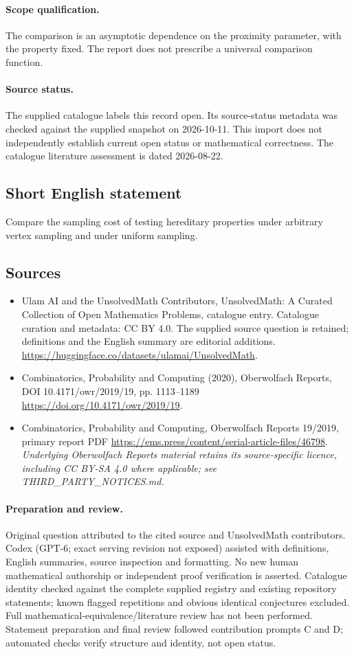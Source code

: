 \documentclass[11pt]{article}
\begin{document}
\paragraph{Scope qualification.}
The comparison is an asymptotic dependence on the proximity parameter, with the property fixed. The report does not prescribe a universal comparison function.
\paragraph{Source status.}
The supplied catalogue labels this record open. Its source-status metadata was checked against the supplied snapshot on 2026-10-11. This import does not independently establish current open status or mathematical correctness. The catalogue literature assessment is dated 2026-08-22.
\subsection{Short English statement}
Compare the sampling cost of testing hereditary properties under arbitrary vertex sampling and under uniform sampling.
\subsection{Sources}
\begin{itemize}
\item[S1] Ulam AI and the UnsolvedMath Contributors, UnsolvedMath: A Curated Collection of Open Mathematics Problems, catalogue entry. Catalogue curation and metadata: CC BY 4.0. The supplied source question is retained; definitions and the English summary are editorial additions.
\url{https://huggingface.co/datasets/ulamai/UnsolvedMath}.
\item[S2] Combinatorics, Probability and Computing (2020), Oberwolfach Reports, DOI 10.4171/owr/2019/19, pp. 1113--1189
\url{https://doi.org/10.4171/owr/2019/19}.
\item[S3] Combinatorics, Probability and Computing, Oberwolfach Reports 19/2019, primary report PDF
\url{https://ems.press/content/serial-article-files/46798}.
\textit{Underlying Oberwolfach Reports material retains its source-specific licence, including CC BY-SA 4.0 where applicable; see THIRD\_PARTY\_NOTICES.md.}
\end{itemize}
\paragraph{Preparation and review.}
Original question attributed to the cited source and UnsolvedMath contributors. Codex (GPT-6; exact serving revision not exposed) assisted with definitions, English summaries, source inspection and formatting. No new human mathematical authorship or independent proof verification is asserted. Catalogue identity checked against the complete supplied registry and existing repository statements; known flagged repetitions and obvious identical conjectures excluded. Full mathematical-equivalence/literature review has not been performed. Statement preparation and final review followed contribution prompts C and D; automated checks verify structure and identity, not open status.
\label{end:statement}
\end{document}
